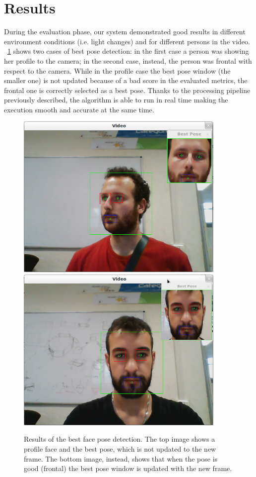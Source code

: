 \documentclass[10pt,a4paper]{report}
\begin{document}
\section*{Results}
During the evaluation phase, our system demonstrated good results in different environment conditions (i.e. light changes) and for different persons in the video. \figurename~\ref{fig:best_pose} shows two cases of best pose detection: in the first case a person was showing her profile to the camera; in the second case, instead, the person was frontal with respect to the camera. While in the profile case the best pose window (the smaller one) is not updated because of a bad score in the evaluated metrics, the frontal one is correctly selected as a best pose. Thanks to the processing pipeline previously described, the algorithm is able to run in real time making the execution smooth and accurate at the same time.
\begin{figure}
\centering
\includegraphics[width=0.9\textwidth]{./best_face_jacopo.png}
\includegraphics[width=0.9\textwidth]{./best_face_rob.png}
\caption{Results of the best face pose detection. The top image shows a profile face and the best pose, which is not updated to the new frame. The bottom image, instead, shows that when the pose is good (frontal) the best pose window is updated with the new frame.}
\label{fig:best_pose}
\end{figure}
\end{document}
